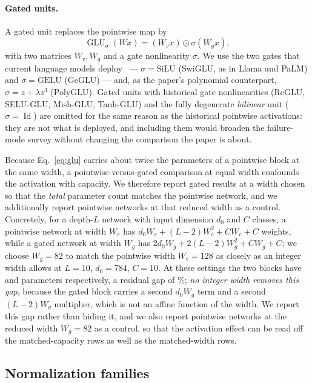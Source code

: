 \paragraph{Gated units.}
A gated unit replaces the pointwise map by
\begin{equation}
\operatorname{GLU}_{\sigma}(W x) = (W_v x) \odot \sigma(W_g x),
\label{eq:glu}
\end{equation}
with two matrices $W_v, W_g$ and a gate nonlinearity $\sigma$. We use the two
gates that current language models deploy~\citep{shazeer2020glu} ---
$\sigma = \mathrm{SiLU}$
(SwiGLU, as in Llama and PaLM) and $\sigma = \mathrm{GELU}$ (GeGLU) --- and,
as the paper's polynomial counterpart, $\sigma = z + \lambda z^{3}$
(PolyGLU). Gated units with historical gate nonlinearities (ReGLU, SELU-GLU,
Mish-GLU, Tanh-GLU)
and the fully degenerate \emph{bilinear} unit ($\sigma =
\operatorname{Id}$) are omitted for the same reason as the historical
pointwise activations: they are not what is deployed, and including them
would broaden the failure-mode survey without changing the comparison the
paper is about.

Because Eq.~\eqref{eq:glu} carries about twice the parameters of a pointwise
block at the same width, a pointwise-versus-gated comparison at equal width
confounds the activation with capacity. We therefore report gated results at
a width chosen so that the \emph{total} parameter count matches the pointwise
network, and we additionally report pointwise networks at that reduced width
as a control. Concretely, for a depth-$L$ network with input dimension
$d_0$ and $C$ classes, a pointwise network at width $W_e$ has
$d_0 W_e + (L-2)W_e^2 + C W_e + C$ weights, while a gated network at width
$W_g$ has $2d_0 W_g + 2(L-2)W_g^2 + C W_g + C$; we choose $W_g = 82$ to match
the pointwise width $W_e = 128$ as closely as an integer width allows at
$L = 10$, $d_0 = 784$, $C = 10$. At these settings the two blocks have
\paramElem{} and \paramGate{} parameters respectively, a residual gap of
\paramGapPct{}\%; \emph{no integer width removes this gap}, because the
gated block carries a second $d_0 W_g$ term and a second $(L-2)W_g$ multiplier,
which is not an affine function of the width. We report this gap rather than
hiding it, and we also report pointwise networks at the reduced width
$W_g = 82$ as a control, so that the activation effect can be read off the
matched-capacity rows as well as the matched-width rows.

\subsection{Normalization families}

